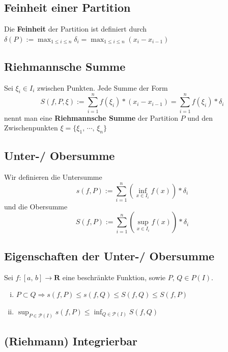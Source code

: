 \documentclass[8pt]{article}
\begin{document}
\begin{multicols*}{3}
\subsection{Feinheit einer Partition}

Die \textbf{Feinheit} der Partition ist definiert durch $\delta(P) := \max_{1 \leq i \leq n} \delta_i = \max_{1 \leq i \leq n} (x_i - x_{i - 1})$

\subsection{Riehmannsche Summe}

Sei $\xi_i \in I_i$ zwischen Punkten. Jede Summe der Form
$$
  S(f, P, \xi) := \sum_{i = 1}^n f(\xi_i) * (x_i - x_{i - 1}) = \sum_{i = 1}^n f(\xi_i) * \delta_i
$$
nennt man eine \textbf{Riehmannsche Summe} der Partition $P$ und den Zwischenpunkten $\xi = \{\xi_1,\, \cdots,\, \xi_n\}$

\subsection{Unter-/ Obersumme}

Wir definieren die Untersumme
$$
  s(f, P) := \sum_{i = 1}^n (\inf_{x \in I_i} f(x)) * \delta_i
$$
und die Obersumme
$$
  S(f, P) := \sum_{i = 1}^n (\sup_{x \in I_i} f(x)) * \delta_i
$$

\subsection{Eigenschaften der Unter-/ Obersumme}

Sei $f: [a,\, b] \rightarrow \mathbf{R}$ eine beschränkte Funktion, sowie $P,\, Q \in P(I)$.
\begin{enumerate}[(i)]
  \item $P \subset Q \Rightarrow s(f, P) \leq s(f, Q) \leq S(f, Q) \leq S(f, P)$
  \item $\sup_{P \in \mathcal{P}(I)} s(f, P) \leq \inf_{Q \in \mathcal{P}(I)} S(f, Q)$
\end{enumerate}

\subsection{(Riehmann) Integrierbar}


\end{multicols*}
\end{document}
